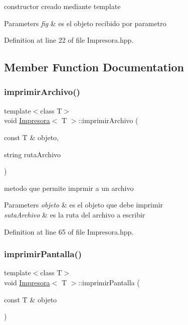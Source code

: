 constructor creado mediante template 


\begin{DoxyParams}{Parameters}
{\em fig} & es el objeto recibido por parametro \\
\hline
\end{DoxyParams}


Definition at line 22 of file Impresora.\+hpp.



\subsection{Member Function Documentation}
\mbox{\label{class_impresora_ac63e5482787086f73c351732f4731239}} 
\subsubsection{\texorpdfstring{imprimir\+Archivo()}{imprimirArchivo()}}
{\footnotesize\ttfamily template$<$class T$>$ \\
void \hyperlink{class_impresora}{Impresora}$<$ T $>$\+::imprimir\+Archivo (\begin{DoxyParamCaption}\item[{const T \&}]{objeto,  }\item[{string}]{ruta\+Archivo }\end{DoxyParamCaption})\hspace{0.3cm}{\ttfamily [inline]}}



metodo que permite imprmir a un archivo 


\begin{DoxyParams}{Parameters}
{\em objeto} & es el objeto que debe imprimir \\
\hline
{\em suta\+Archivo} & es la ruta del archivo a escribir \\
\hline
\end{DoxyParams}


Definition at line 65 of file Impresora.\+hpp.

\mbox{\label{class_impresora_a7427f11d194603c5ae2b7f4837c49f14}} 
\subsubsection{\texorpdfstring{imprimir\+Pantalla()}{imprimirPantalla()}}
{\footnotesize\ttfamily template$<$class T$>$ \\
void \hyperlink{class_impresora}{Impresora}$<$ T $>$\+::imprimir\+Pantalla (\begin{DoxyParamCaption}\item[{const T \&}]{objeto }\end{DoxyParamCaption})\hspace{0.3cm}{\ttfamily [inline]}}



